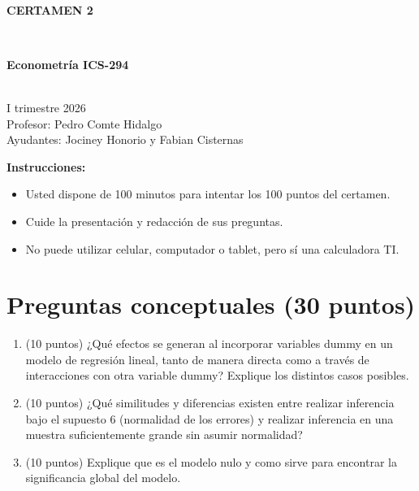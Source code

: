 \documentclass[10pt,a4paper]{article}
\begin{document}
\vspace{5cm}



\begin{center}
\begin{large}
\textbf{\\CERTAMEN 2}
\end{large}\\
\end{center}

\begin{center}
\begin{large}
\textbf{Econometría ICS-294}
\end{large}\\
\vspace{0.2cm}
I trimestre 2026\\
Profesor: Pedro Comte Hidalgo\\
Ayudantes: Jociney Honorio y Fabian Cisternas
\end{center}

\textbf{Instrucciones:} 

\begin{itemize}

    \item Usted dispone de 100 minutos  para intentar los 100 puntos del certamen.
    \item Cuide la presentación y redacción de sus preguntas.
    \item No puede utilizar celular, computador o tablet, pero sí una calculadora TI.
     
\end{itemize}

\section{Preguntas conceptuales (30 puntos)}

\begin{enumerate}
    \item  (10 puntos) ¿Qué efectos se generan al incorporar variables dummy en un modelo de regresión lineal, tanto de manera directa como a través de interacciones con otra variable dummy? 
Explique los distintos casos posibles.


    \item (10 puntos) ¿Qué similitudes y diferencias existen entre realizar inferencia bajo el supuesto 6 (normalidad de los errores) y realizar inferencia en una muestra suficientemente grande sin asumir normalidad?

\item (10 puntos) Explique que es el modelo nulo y como sirve para encontrar la significancia global del modelo.


\end{enumerate}
\end{document}
